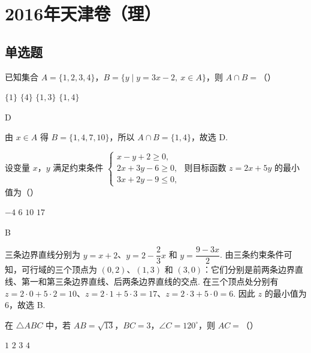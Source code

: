 \chapter{2016年天津卷（理）}

\section{单选题}

\begin{problem}
已知集合 \(A=\{1,2,3,4\}\)，\(B=\{y\mid y=3x-2,\ x\in A\}\)，则 \(A\cap B=\)（\quad）

\choices
    {\(\{1\}\)}
    {\(\{4\}\)}
    {\(\{1,3\}\)}
    {\(\{1,4\}\)}
\end{problem}

\begin{answer}
D
\end{answer}

\begin{solution}
由 \(x\in A\) 得 \(B=\{1,4,7,10\}\)，所以 \(A\cap B=\{1,4\}\)，故选 D.
\end{solution}

\begin{problem}
设变量 \(x\)，\(y\) 满足约束条件
\(\begin{cases}
x-y+2\ge 0,\\
2x+3y-6\ge 0,\\
3x+2y-9\le 0,
\end{cases}\)
则目标函数 \(z=2x+5y\) 的最小值为（\quad）

\choices
    {\(-4\)}
    {\(6\)}
    {\(10\)}
    {\(17\)}
\end{problem}

\begin{answer}
B
\end{answer}

\begin{solution}
三条边界直线分别为 \(y=x+2\)、\(y=2-\dfrac23x\) 和 \(y=\dfrac{9-3x}{2}\). 由三条约束条件可知，可行域的三个顶点为
\((0,2)\)、\((1,3)\) 和 \((3,0)\)：它们分别是前两条边界直线、第一和第三条边界直线、后两条边界直线的交点. 在三个顶点处分别有
\(z=2\cdot0+5\cdot2=10\)、\(z=2\cdot1+5\cdot3=17\)、\(z=2\cdot3+5\cdot0=6\). 因此 \(z\) 的最小值为 \(6\)，故选 B.
\end{solution}

\begin{problem}
在 \(\triangle ABC\) 中，若 \(AB=\sqrt{13}\)，\(BC=3\)，\(\angle C=120^\circ\)，则 \(AC=\)（\quad）

\choices
    {\(1\)}
    {\(2\)}
    {\(3\)}
    {\(4\)}
\end{problem}

